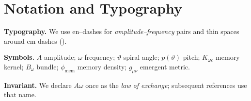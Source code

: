 


\section*{Notation and Typography}
\noindent\textbf{Typography.} We use en--dashes for \textit{amplitude--frequency} pairs and thin spaces around em dashes (\emdash).

\noindent\textbf{Symbols.}
$A$ amplitude; $\omega$ frequency; $\vartheta$ spiral angle;
$p(\vartheta)$ pitch; $K_{\omega\varepsilon}$ memory kernel;
$B_{\omega}$ bundle; $\phi_{\mathrm{mem}}$ memory density; $g_{\mu\nu}$ emergent metric.

\noindent\textbf{Invariant.} We declare $A\omega$ once as the \emph{law of exchange}; subsequent references use that name.

